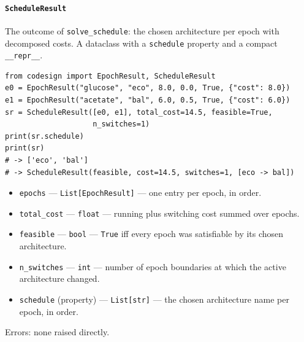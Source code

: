 \documentclass[11pt,a4paper]{article}
\begin{document}
\paragraph{\texttt{ScheduleResult}}\label{ref:temporal:scheduleresult}
The outcome of \texttt{solve\_schedule}: the chosen architecture per epoch
with decomposed costs. A dataclass with a \texttt{schedule} property and a
compact \texttt{\_\_repr\_\_}.
\begin{lstlisting}
from codesign import EpochResult, ScheduleResult
e0 = EpochResult("glucose", "eco", 8.0, 0.0, True, {"cost": 8.0})
e1 = EpochResult("acetate", "bal", 6.0, 0.5, True, {"cost": 6.0})
sr = ScheduleResult([e0, e1], total_cost=14.5, feasible=True,
                    n_switches=1)
print(sr.schedule)
print(sr)
# -> ['eco', 'bal']
# -> ScheduleResult(feasible, cost=14.5, switches=1, [eco -> bal])
\end{lstlisting}
\begin{itemize}[nosep]
  \item \texttt{epochs} --- \texttt{List[EpochResult]} --- one entry per
    epoch, in order.
  \item \texttt{total\_cost} --- \texttt{float} --- running plus switching
    cost summed over epochs.
  \item \texttt{feasible} --- \texttt{bool} --- \texttt{True} iff every
    epoch was satisfiable by its chosen architecture.
  \item \texttt{n\_switches} --- \texttt{int} --- number of epoch boundaries
    at which the active architecture changed.
  \item \texttt{schedule} (property) --- \texttt{List[str]} --- the chosen
    architecture name per epoch, in order.
\end{itemize}
Errors: none raised directly.
\end{document}
